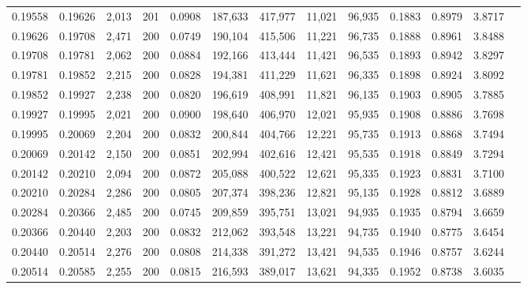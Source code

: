 \begin{tabular}{rrrrrrrrrrrrr}
0.19558 & 0.19626 & 2,013 & 201 &                                     0.0908 & 187,633 & 417,977 &  11,021 &  96,935 & 0.1883 & 0.8979 & 3.8717 \\
0.19626 & 0.19708 & 2,471 & 200 &                                     0.0749 & 190,104 & 415,506 &  11,221 &  96,735 & 0.1888 & 0.8961 & 3.8488 \\
0.19708 & 0.19781 & 2,062 & 200 &                                     0.0884 & 192,166 & 413,444 &  11,421 &  96,535 & 0.1893 & 0.8942 & 3.8297 \\
0.19781 & 0.19852 & 2,215 & 200 &                                     0.0828 & 194,381 & 411,229 &  11,621 &  96,335 & 0.1898 & 0.8924 & 3.8092 \\
0.19852 & 0.19927 & 2,238 & 200 &                                     0.0820 & 196,619 & 408,991 &  11,821 &  96,135 & 0.1903 & 0.8905 & 3.7885 \\
0.19927 & 0.19995 & 2,021 & 200 &                                     0.0900 & 198,640 & 406,970 &  12,021 &  95,935 & 0.1908 & 0.8886 & 3.7698 \\
0.19995 & 0.20069 & 2,204 & 200 &                                     0.0832 & 200,844 & 404,766 &  12,221 &  95,735 & 0.1913 & 0.8868 & 3.7494 \\
0.20069 & 0.20142 & 2,150 & 200 &                                     0.0851 & 202,994 & 402,616 &  12,421 &  95,535 & 0.1918 & 0.8849 & 3.7294 \\
0.20142 & 0.20210 & 2,094 & 200 &                                     0.0872 & 205,088 & 400,522 &  12,621 &  95,335 & 0.1923 & 0.8831 & 3.7100 \\
0.20210 & 0.20284 & 2,286 & 200 &                                     0.0805 & 207,374 & 398,236 &  12,821 &  95,135 & 0.1928 & 0.8812 & 3.6889 \\
0.20284 & 0.20366 & 2,485 & 200 &                                     0.0745 & 209,859 & 395,751 &  13,021 &  94,935 & 0.1935 & 0.8794 & 3.6659 \\
0.20366 & 0.20440 & 2,203 & 200 &                                     0.0832 & 212,062 & 393,548 &  13,221 &  94,735 & 0.1940 & 0.8775 & 3.6454 \\
0.20440 & 0.20514 & 2,276 & 200 &                                     0.0808 & 214,338 & 391,272 &  13,421 &  94,535 & 0.1946 & 0.8757 & 3.6244 \\
0.20514 & 0.20585 & 2,255 & 200 &                                     0.0815 & 216,593 & 389,017 &  13,621 &  94,335 & 0.1952 & 0.8738 & 3.6035 \\

\end{tabular}
